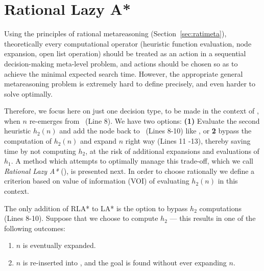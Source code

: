 \section{Rational Lazy A*}

Using the principles of rational metareasoning (Section~\ref{sec:ratimeta}),
theoretically every computational operator (heuristic function evaluation, node
expansion, open list operation) should be treated as an action in a sequential
decision-making meta-level problem, and actions should be chosen so as to
achieve the minimal expected search time. However, the appropriate
general metareasoning problem is extremely hard to define precisely, and even harder
to solve optimally.

Therefore, we focus here on just one decision type, to be made in the
context of \lazyastar, when $n$ re-emerges from \OPEN~(Line 8).  We
have two options: {\bf (1)} Evaluate the second heuristic $h_2(n)$ and
add the node back to \OPEN~(Lines 8-10) like \lazyastar, or {\bf 2}
bypass the computation of $h_2(n)$ and expand $n$ right way (Lines 11
-13), thereby saving time by not computing $h_2$, at the risk of
additional expansions and evaluations of $h_1$.  A method which
attempts to optimally manage this trade-off, which we
call \textit{Rational Lazy A*} (\rationallazyastar), is presented
next.  In order to choose rationally we define a criterion based on
value of information (VOI) of evaluating $h_2(n)$ in this context.

The only addition of RLA* to LA* is the option to bypass $h_2$ computations (Lines 8-10).
Suppose that we choose to compute $h_2$ --- this results in one of the
following outcomes:
\begin{enumerate}
\item $n$ is eventually expanded.
\item $n$ is re-inserted into \OPEN, and the goal is found without ever expanding $n$.
\end{enumerate}

